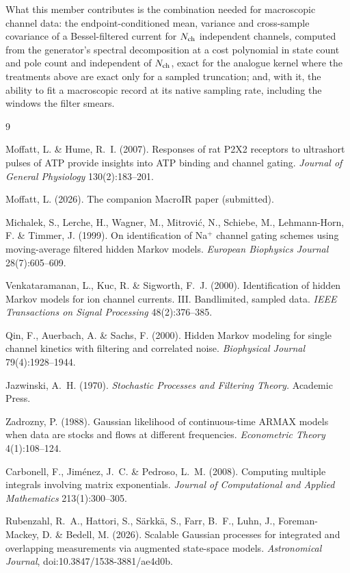 \documentclass[11pt]{article}
\begin{document}
What this member contributes is the combination needed for macroscopic
channel data: the endpoint-conditioned mean, variance and cross-sample
covariance of a Bessel-filtered current for $N_{\mathrm{ch}}$ independent channels,
computed from the generator's spectral decomposition at a cost polynomial
in state count and pole count and independent of $N_{\mathrm{ch}}$, exact for the
analogue kernel where the treatments above are exact only for a sampled
truncation; and, with it, the ability to fit a macroscopic record at its
native sampling rate, including the windows the filter smears.

\begin{thebibliography}{9}

Moffatt, L. \& Hume, R.~I. (2007).
Responses of rat P2X2 receptors to ultrashort pulses of ATP provide
insights into ATP binding and channel gating.
\emph{Journal of General Physiology} 130(2):183--201.

Moffatt, L. (2026). The companion MacroIR paper (submitted).

Michalek, S., Lerche, H., Wagner, M., Mitrovi\'c, N., Schiebe, M.,
Lehmann-Horn, F. \& Timmer, J. (1999).
On identification of Na$^+$ channel gating schemes using moving-average
filtered hidden Markov models.
\emph{European Biophysics Journal} 28(7):605--609.

Venkataramanan, L., Kuc, R. \& Sigworth, F.~J. (2000).
Identification of hidden Markov models for ion channel currents.
III. Bandlimited, sampled data.
\emph{IEEE Transactions on Signal Processing} 48(2):376--385.

Qin, F., Auerbach, A. \& Sachs, F. (2000).
Hidden Markov modeling for single channel kinetics with filtering and
correlated noise.
\emph{Biophysical Journal} 79(4):1928--1944.

Jazwinski, A.~H. (1970).
\emph{Stochastic Processes and Filtering Theory.}
Academic Press.

Zadrozny, P. (1988).
Gaussian likelihood of continuous-time ARMAX models when data are stocks
and flows at different frequencies.
\emph{Econometric Theory} 4(1):108--124.

Carbonell, F., Jim\'enez, J.~C. \& Pedroso, L.~M. (2008).
Computing multiple integrals involving matrix exponentials.
\emph{Journal of Computational and Applied Mathematics} 213(1):300--305.

Rubenzahl, R.~A., Hattori, S., S\"arkk\"a, S., Farr, B.~F., Luhn, J.,
Foreman-Mackey, D. \& Bedell, M. (2026).
Scalable Gaussian processes for integrated and overlapping measurements
via augmented state-space models.
\emph{Astronomical Journal}, doi:10.3847/1538-3881/ae4d0b.

\end{thebibliography}
\end{document}
